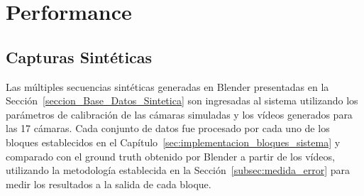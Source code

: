 \section{Performance}\label{seccion_performance}

\subsection{Capturas Sintéticas}

Las múltiples secuencias sintéticas generadas en Blender presentadas en la Sección~\ref{seccion_Base_Datos_Sintetica} son ingresadas al sistema utilizando los parámetros de calibración de las cámaras simuladas y los vídeos generados para las 17 cámaras. Cada conjunto de datos fue procesado por cada uno de los bloques establecidos en el Capítulo~\ref{sec:implementacion_bloques_sistema} y comparado con el ground truth obtenido por Blender a partir de los vídeos, utilizando la metodología establecida en la Sección~\ref{subsec:medida_error} para medir los resultados a la salida de cada bloque. 


